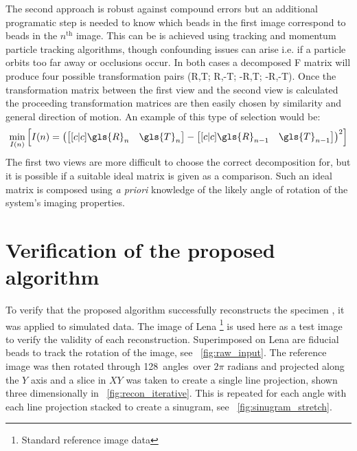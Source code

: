 The second approach is robust against compound errors but an additional programatic step is needed to know which beads in the first image correspond to beads in the \(n^{\text{th}}\) image.
This can be is achieved using tracking and momentum particle tracking algorithms, though confounding issues can arise i.e. if a particle orbits too far away or occlusions occur.
In both cases a decomposed \gls{F} matrix will produce four possible transformation pairs (\gls{R},\gls{T}; \gls{R},-\gls{T}; -\gls{R},\gls{T}; -\gls{R},-\gls{T}). %
Once the transformation matrix between the first view and the second view is calculated the proceeding transformation matrices are then easily chosen by similarity and general direction of motion.
An example of this type of selection would be:
\begin{align}
\min_{I(n)}\left[I(n) = \left(\begin{bmatrix}[c|c] \gls{R}_n&\gls{T}_n \end{bmatrix} - \begin{bmatrix}[c|c] \gls{R}_{n-1}&\gls{T}_{n-1} \end{bmatrix}\right)^2\right]
\end{align}
The first two views are more difficult to choose the correct decomposition for, but it is possible if a suitable ideal matrix is given as a comparison.
Such an ideal matrix is composed using \emph{a priori} knowledge of the likely angle of rotation of the system's imaging properties.

\section{Verification of the proposed algorithm}

To verify that the proposed algorithm successfully reconstructs the specimen%
, it was applied to simulated data.
The image of Lena
\footnote{Standard reference image data
}
is used here as a test image to verify the validity of each reconstruction.
Superimposed on Lena are fiducial beads to track the rotation of the image, see \figurename~\ref{fig:raw_input}.
The reference image was then rotated through \SI{128} angles over $2\pi$ radians and projected along the $Y$ axis and a slice in $XY$ was taken to create a single line projection, shown three dimensionally in \figurename~\ref{fig:recon_iterative}.
This is repeated for each angle with each line projection stacked to create a sinugram, see \figurename~\ref{fig:sinugram_stretch}.

